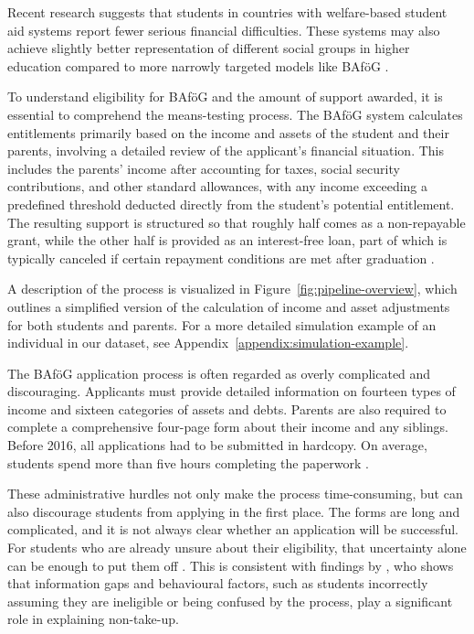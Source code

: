 Recent research suggests that students in countries with welfare-based student aid systems report fewer serious financial difficulties. These systems may also achieve slightly better representation of different social groups in higher education compared to more narrowly targeted models like BAföG  \citep{gwosc_krisenbewaltigung_2022}.

To understand eligibility for BAföG and the amount of support awarded, it is essential to comprehend the means-testing process. The BAföG system calculates entitlements primarily based on the income and assets of the student and their parents, involving a detailed review of the applicant’s financial situation. This includes the parents’ income after accounting for taxes, social security contributions, and other standard allowances, with any income exceeding a predefined threshold deducted directly from the student’s potential entitlement. The resulting support is structured so that roughly half comes as a non-repayable grant, while the other half is provided as an interest-free loan, part of which is typically canceled if certain repayment conditions are met after graduation \citep{herber_non-take-up_2019}.

A description of the process is visualized in Figure~\ref{fig:pipeline-overview}, which outlines a simplified version of the calculation of income and asset adjustments for both students and parents. For a more detailed simulation example of an individual in our dataset, see Appendix~\ref{appendix:simulation-example}.

The BAföG application process is often regarded as overly complicated and discouraging. Applicants must provide detailed information on fourteen types of income and sixteen categories of assets and debts. Parents are also required to complete a comprehensive four-page form about their income and any siblings. Before 2016, all applications had to be submitted in hardcopy. On average, students spend more than five hours completing the paperwork \citep{fidan_why_2021}.

These administrative hurdles not only make the process time-consuming, but can also discourage students from applying in the first place. 
The forms are long and complicated, and it is not always clear whether an application will be successful. 
For students who are already unsure about their eligibility, that uncertainty alone can be enough to put them off \citep{kroher_studierendenbefragung_2023}. 
This is consistent with findings by \cite{fidan_why_2021}, who shows that information gaps and behavioural factors, such as students incorrectly assuming they are ineligible or being confused by the process, play a significant role in explaining non-take-up.

